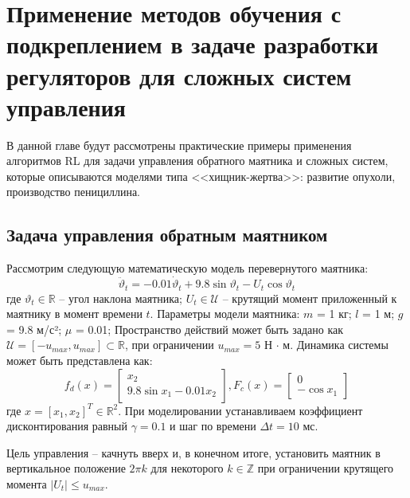 \newpage
\chapter{Применение методов обучения с подкреплением в задаче разработки регуляторов для сложных систем управления} \label{ch3}


В данной главе будут рассмотрены практические примеры применения алгоритмов RL для задачи управления обратного маятника и сложных систем, которые описываются моделями типа <<хищник-жертва>>: развитие опухоли, производство пенициллина. 
	
\section{Задача управления обратным маятником} \label{ch3:sec1}
Рассмотрим следующую математическую модель перевернутого маятника:
%
\begin{equation*}
\ddot \vartheta_t = -0.01 \dot \vartheta_t + 9.8 \sin \vartheta_t - U_t \cos \vartheta_t
\end{equation*}
%
где $\vartheta_t \in \mathbb{R}$ -- угол наклона маятника; $U_t \in \mathcal{U}$ -- крутящий момент приложенный к маятнику в момент времени $t$. Параметры модели маятника: \(m\) = 1 кг; \(l\) = 1 м; \(g\) = 9.8 м/с²; \(\mu\) = 0.01;
Пространство действий может быть задано как $\mathcal{U}=[-u_{max},u_{max}] \subset \mathbb{R}$, при ограничении $u_{max} = 5$ Н $\cdot$ м. Динамика системы может быть представлена как:
%
\begin{equation*}
	f_d(x) = 
	\begin{bmatrix}
		x_2 \\
		9.8 \sin x_1 - 0.01x_2
	\end{bmatrix}
	, F_c(x)=
	\begin{bmatrix}
		0\\
		-\cos x_1
	\end{bmatrix}
\end{equation*}
%
где $x = [x_1, x_2]^T \in \mathbb{R}^2$. При моделировании устанавливаем коэффициент дисконтирования равный $\gamma = 0.1$ и шаг по времени \(\Delta t = 10\) мс.

Цель управления -- качнуть вверх и, в конечном итоге, установить маятник в вертикальное положение $2\pi k$ для некоторого $k \in \mathbb{Z}$ при ограничении крутящего момента $|U_t| \leq u_{max}$. 

